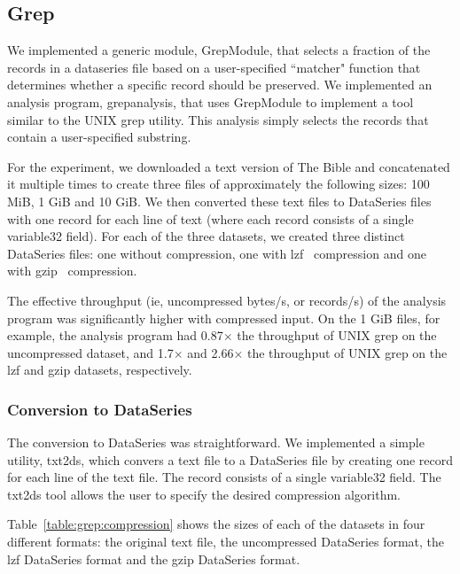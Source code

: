 \subsection{Grep}\label{sec:grep}

We implemented a generic module, GrepModule, that selects a fraction of the records in a dataseries file based on a user-specified ``matcher" function that determines whether a specific record should be preserved. We implemented an analysis program, grepanalysis, that uses GrepModule to implement a tool similar to the UNIX grep utility. This analysis simply selects the records that contain a user-specified substring.

For the experiment, we downloaded a text version of The Bible and concatenated it multiple times to create three files of approximately the following sizes: 100 MiB, 1 GiB and 10 GiB. We then converted these text files to DataSeries files with one record for each line of text (where each record consists of a single variable32 field). For each of the three datasets, we created three distinct DataSeries files: one without compression, one with lzf~\cite{LZF} compression and one with gzip~\cite{GZIP} compression.

The effective throughput (ie, uncompressed bytes/s, or records/s) of the analysis program was significantly higher with compressed input. On the 1 GiB files, for example, the analysis program had 0.87$\times$ the throughput of UNIX grep on the uncompressed dataset, and 1.7$\times$ and 2.66$\times$ the throughput of UNIX grep on the lzf and gzip datasets, respectively.

\subsubsection{Conversion to DataSeries}

The conversion to DataSeries was straightforward. We implemented a simple utility, txt2ds, which convers a text file to a DataSeries file by creating one record for each line of the text file. The record consists of a single variable32 field. The txt2ds tool allows the user to specify the desired compression algorithm.

Table~\ref{table:grep:compression} shows the sizes of each of the datasets in four different formats: the original text file, the uncompressed DataSeries format, the lzf DataSeries format and the gzip DataSeries format.



